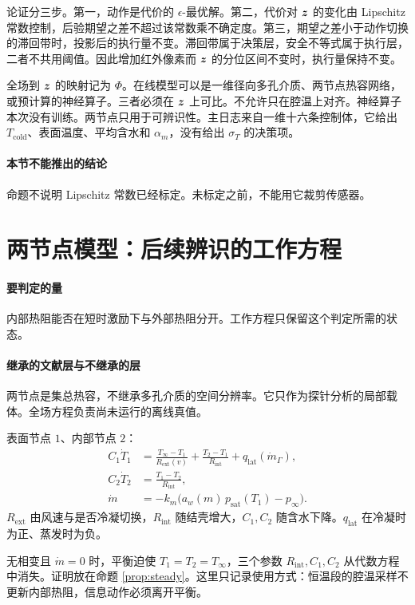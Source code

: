 论证分三步。第一，动作是代价的 \(\epsilon\)-最优解。第二，代价对 \(\bm{z}\) 的变化由 Lipschitz 常数控制，后验期望之差不超过该常数乘不确定度。第三，期望之差小于动作切换的滞回带时，投影后的执行量不变。滞回带属于决策层，安全不等式属于执行层，二者不共用阈值。因此增加红外像素而 \(\bm{z}\) 的分位区间不变时，执行量保持不变。

全场到 \(\bm{z}\) 的映射记为 \(\Phi\)。在线模型可以是一维径向多孔介质、两节点热容网络，或预计算的神经算子。三者必须在 \(\bm{z}\) 上可比。不允许只在腔温上对齐。神经算子本次没有训练。两节点只用于可辨识性。主日志来自一维十六条控制体，它给出 \(T_{\mathrm{cold}}\)、表面温度、平均含水和 \(\alpha_m\)，没有给出 \(\sigma_T\) 的决策项。

\paragraph{本节不能推出的结论}
命题不说明 Lipschitz 常数已经标定。未标定之前，不能用它裁剪传感器。

\section{两节点模型：后续辨识的工作方程}

\paragraph{要判定的量}
内部热阻能否在短时激励下与外部热阻分开。工作方程只保留这个判定所需的状态。

\paragraph{继承的文献层与不继承的层}
两节点是集总热容，不继承多孔介质的空间分辨率。它只作为探针分析的局部载体。全场方程负责尚未运行的离线真值。

表面节点 \(1\)、内部节点 \(2\)：
\begin{align}
\label{eq:twonode}
C_1\dot T_1
&=\frac{T_\infty-T_1}{R_{\mathrm{ext}}(v)}+\frac{T_2-T_1}{R_{\mathrm{int}}}
+q_{\mathrm{lat}}(\dot m_\Gamma),\\
C_2\dot T_2
&=\frac{T_1-T_2}{R_{\mathrm{int}}},\\
\dot m
&=-k_m\big(a_w(m)\,p_{\mathrm{sat}}(T_1)-p_\infty\big).
\end{align}
\(R_{\mathrm{ext}}\) 由风速与是否冷凝切换，\(R_{\mathrm{int}}\) 随结壳增大，\(C_1,C_2\) 随含水下降。\(q_{\mathrm{lat}}\) 在冷凝时为正、蒸发时为负。

无相变且 \(\dot m=0\) 时，平衡迫使 \(T_1=T_2=T_\infty\)，三个参数 \(R_{\mathrm{int}},C_1,C_2\) 从代数方程中消失。证明放在命题 \ref{prop:steady}。这里只记录使用方式：恒温段的腔温采样不更新内部热阻，信息动作必须离开平衡。

